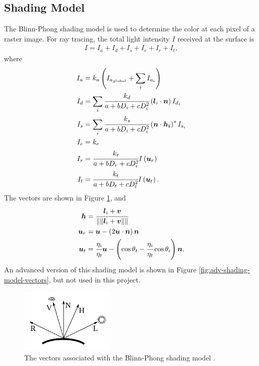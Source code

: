 \documentclass[letterpaper, 11pt, onecolumn, oneside]{article}
\newcommand{\norm}[1]{\left\lVert#1\right\rVert}
\begin{document}
    \subsection{Shading Model}
    \label{section:ray-shading}
        The Blinn-Phong shading model is used to determine the color at each pixel of a raster image.
        For ray tracing, the total light intensity $I$ received at the surface is
        \begin{align}
            I = I_a + I_d + I_s + I_e + I_r + I_t,
        \end{align}
        where
        \begin{align}
            I_a &= k_a\left(I_{a_{global}} + \sum_i I_{a_i}\right) \\
            I_d &= \sum_i \cfrac{k_d}{a + bD_i + cD_i^2} \left(\boldsymbol{l}_i \cdot \boldsymbol{n}\right) I_{d_i}\\
            I_s &= \sum_i \cfrac{k_s}{a + bD_i + cD_i^2} \left(\boldsymbol{n} \cdot \boldsymbol{h_i}\right)^s I_{s_i}\\
            I_e &= k_e \\
            I_r &= \cfrac{k_r}{a + bD_r + cD_r^2} I\left(\boldsymbol{u}_r\right) \\
            I_t &= \cfrac{k_t}{a + bD_t + cD_t^2} I\left(\boldsymbol{u}_t\right).
        \end{align}
        The vectors are shown in Figure \ref{fig:blinnphong-vectors}, and
        \begin{align}
            \boldsymbol{h} &= \cfrac{\boldsymbol{l}_i + \boldsymbol{v}}{\norm{\norm{\boldsymbol{l}_i + \boldsymbol{v}}}} \\
            \boldsymbol{u}_r &= \boldsymbol{u} - \left(2\boldsymbol{u} \cdot \boldsymbol{n}\right) \boldsymbol{n} \\
            \boldsymbol{u}_t &= \cfrac{\eta_i}{\eta_t}\boldsymbol{u} - \left(\cos{\theta_t} - \cfrac{\eta_i}{\eta_t}\cos{\theta_i}\right) \boldsymbol{n}.
        \end{align}
        An advanced version of this shading model is shown in Figure \ref{fig:adv-shading-model-vectors}, but not used in this project.

        \begin{figure}[ht]
            \includegraphics[width=0.4\textwidth]{blinnphong-vectors.png}
            \centering
            \caption{The vectors associated with the Blinn-Phong shading model \cite{kraus2011}.}
            \label{fig:blinnphong-vectors}
        \end{figure}
\end{document}

